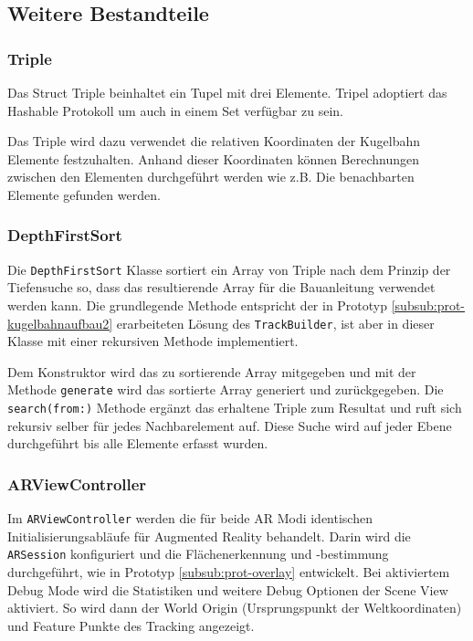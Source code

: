 \subsection{Weitere Bestandteile}

\subsubsection{Triple} \label{subsub:umsetzung-triple}
Das Struct Triple beinhaltet ein Tupel mit drei Elemente. Tripel adoptiert das Hashable Protokoll um auch in einem Set verfügbar zu sein.

Das Triple wird dazu verwendet die relativen Koordinaten der Kugelbahn Elemente festzuhalten. Anhand dieser Koordinaten können Berechnungen zwischen den Elementen durchgeführt werden wie z.B. Die benachbarten Elemente gefunden werden.

\subsubsection{DepthFirstSort} \label{subsub:umsetzung-depthfirst}

Die \texttt{DepthFirstSort} Klasse sortiert ein Array von Triple nach dem Prinzip der Tiefensuche so, dass das resultierende Array für die Bauanleitung verwendet werden kann.
Die grundlegende Methode entspricht der in Prototyp \ref{subsub:prot-kugelbahnaufbau2} erarbeiteten Lösung des \texttt{TrackBuilder}, ist aber in dieser Klasse mit einer rekursiven Methode implementiert.

Dem Konstruktor wird das zu sortierende Array mitgegeben und mit der Methode \texttt{generate} wird das sortierte Array generiert und zurückgegeben.
Die \texttt{search(from:)} Methode ergänzt das erhaltene Triple zum Resultat und ruft sich rekursiv selber für jedes Nachbarelement auf.
Diese Suche wird auf jeder Ebene durchgeführt bis alle Elemente erfasst wurden.

\subsubsection{ARViewController} \label{subsub:umsetzung-arviewcontroller}

Im \texttt{ARViewController} werden die für beide AR Modi identischen Initialisierungsabläufe für Augmented Reality behandelt.
Darin wird die \texttt{ARSession} konfiguriert und die Flächenerkennung und -bestimmung durchgeführt, wie in Prototyp \ref{subsub:prot-overlay} entwickelt.
Bei aktiviertem Debug Mode wird die Statistiken und weitere Debug Optionen der Scene View aktiviert.
So wird dann der World Origin (Ursprungspunkt der Weltkoordinaten) und Feature Punkte des Tracking angezeigt.

